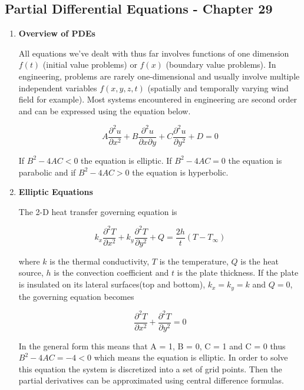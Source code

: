 \subsection{Partial Differential Equations - Chapter 29}

\begin{enumerate}

  \item {\bf Overview of PDEs}

    All equations we've dealt with thus far involves functions of one
    dimension $f(t)$ (initial value problems) or $f(x)$ (boundary value
    problems). In engineering, problems are rarely one-dimensional and
    usually involve multiple independent variables $f(x,y,z,t)$
    (spatially and temporally varying wind field for example). Most
    systems encountered in engineering are second order and can be
    expressed using the equation below.

    \begin{equation} 
      A \frac{\partial^2 u}{\partial x^2} + B \frac{\partial^2
        u}{\partial x \partial y} + C \frac{\partial^2 u}{\partial y^2}
      + D = 0
    \end{equation}
    
    If $B^2-4AC < 0$ the equation is elliptic. If $B^2-4AC = 0$ the
    equation is parabolic and if $B^2-4AC > 0$ the equation is
    hyperbolic. 

  \item {\bf Elliptic Equations}

    The 2-D heat transfer governing equation is

    \begin{equation}
      k_x \frac{\partial^2 T}{\partial x^2} + k_y \frac{\partial^2
        T}{\partial y^2} + Q = \frac{2h}{t} (T-T_\infty)
    \end{equation}
    
    where $k$ is the thermal conductivity, $T$ is the temperature, $Q$
    is the heat source, $h$ is the convection coefficient and $t$ is
    the plate thickness. If the plate is insulated on its lateral
    surfaces(top and bottom), $k_x=k_y=k$ and $Q=0$, the governing equation becomes 

    \begin{equation}
      \frac{\partial^2 T}{\partial x^2} + \frac{\partial^2
        T}{\partial y^2} = 0
    \end{equation}
    
    In the general form this means that A = 1, B = 0, C = 1 and C = 0
    thus $B^2-4AC = -4 < 0$ which means the equation is elliptic. In
    order to solve this equation the system is discretized into a set
    of grid points. Then the partial derivatives can be approximated
    using central difference formulas.


\end{enumerate}
